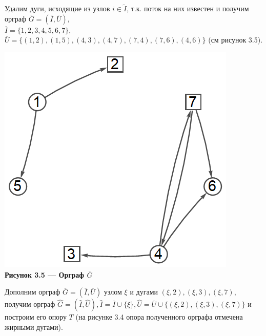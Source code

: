 \documentclass[14pt]{extarticle}%
\begin{document}
Удалим дуги, исходящие из узлов $i\in \widetilde{I}$, т.к. поток на них известен и получим орграф $\overline{G}=(\overline{I},\overline{U})$,\\ $\overline{I}=\{1,2,3,4,5,6,7\}$,\\ $\overline{U}=\{(1 , 2), (1 , 5), (4 , 3),  (4 , 7), (7 , 4), (7 , 6),  (4 , 6)\}$ (см рисунок 3.5).

\begin{center}
\includegraphics[scale=0.6]{grs/s2overg.png}\\
\textbf{Рисунок 3.5 --- Орграф $\overline{G}$}
\end{center}

Дополним орграф $\overline{G}=(\overline{I},\overline{U})$ узлом $\xi$ и дугами $(\xi,2), (\xi,3), (\xi,7)$, получим орграф $\widehat{G}=(\widehat{I}, \widehat{U}), \widehat{I}=\overline{I}\cup \{\xi\}, \widehat{U}=\overline{U}\cup \{(\xi,2), (\xi,3), (\xi,7)\}$ и построим его опору $T$ (на рисунке 3.4 опора полученного орграфа отмечена жирными дугами).
\end{document}
